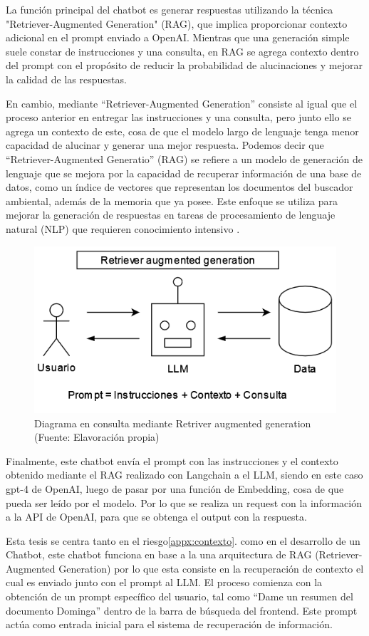 La función principal del chatbot es generar respuestas utilizando la técnica "Retriever-Augmented Generation" (RAG), 
que implica proporcionar contexto adicional en el prompt enviado a OpenAI. Mientras que una generación simple suele 
constar de instrucciones y una consulta, en RAG se agrega contexto dentro del prompt con el propósito de reducir la 
probabilidad de alucinaciones y mejorar la calidad de las respuestas. 


En cambio, mediante ``Retriever-Augmented Generation'' 
consiste al igual que el proceso anterior en entregar las instrucciones y una consulta, pero junto ello se agrega un contexto 
de este, cosa de que el modelo largo de lenguaje tenga menor capacidad de alucinar y generar una mejor respuesta. Podemos decir
que ``Retriever-Augmented Generatio'' (RAG) se refiere a un modelo de generación de lenguaje que se mejora por la capacidad 
de recuperar información de una base de datos, como un índice de vectores que representan los documentos del buscador ambiental, 
además de la memoria que ya posee. Este enfoque se utiliza para mejorar la generación de respuestas en tareas de procesamiento 
de lenguaje natural (NLP) que requieren conocimiento intensivo \cite{raq}.

\begin{figure}[ht!]
    \centering
    \includegraphics[width=.4\textwidth]{figures/huemul5.png}
    \caption[Diagrama en consulta mediante Retriver augmented generation]{Diagrama en consulta mediante Retriver augmented generation\\
    {\scriptsize (Fuente: Elavoración propia)}}
    \label{fig:chatbot1}
\end{figure}

Finalmente, este chatbot envía el prompt con las instrucciones y el contexto obtenido mediante el RAG realizado con 
Langchain a el LLM, siendo en este caso gpt-4 de OpenAI, luego de pasar por una función de Embedding, cosa de que 
pueda ser leído por el modelo. Por lo que se realiza un request con la información a la API de OpenAI, para que se 
obtenga el output con la respuesta.


Esta tesis se centra tanto en el riesgo\autoref{appx:contexto}. como en el desarrollo de un Chatbot, este chatbot funciona 
en base a la una arquitectura de RAG (Retriever-Augmented Generation) por lo que esta consiste en 
la recuperación de contexto el cual es enviado junto con el prompt al LLM. El proceso comienza con 
la obtención de un prompt específico del usuario, tal como ``Dame un resumen del documento Dominga'' 
dentro de la barra de búsqueda del frontend. Este prompt actúa como entrada inicial para el sistema 
de recuperación de información.

